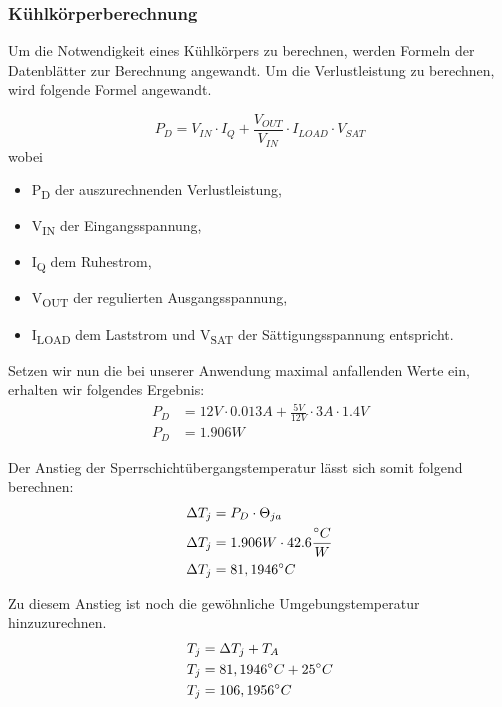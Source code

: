 \subsubsection{Kühlkörperberechnung}

Um die Notwendigkeit eines Kühlkörpers zu berechnen, werden Formeln der Datenblätter zur Berechnung angewandt.
Um die Verlustleistung zu berechnen, wird folgende Formel angewandt.

\begin{equation}
    P_D = V_{IN} \cdot I_Q + \frac{V_{OUT}}{V_{IN}} \cdot I_{LOAD} \cdot V_{SAT}
\end{equation}
wobei
\begin{itemize}
    \item P\textsubscript{D} der auszurechnenden Verlustleistung,
    \item V\textsubscript{IN} der Eingangsspannung,
    \item I\textsubscript{Q} dem Ruhestrom,
    \item V\textsubscript{OUT} der regulierten Ausgangsspannung,
    \item I\textsubscript{LOAD} dem Laststrom und V\textsubscript{SAT} der Sättigungsspannung entspricht.
\end{itemize}

Setzen wir nun die bei unserer Anwendung maximal anfallenden Werte ein, erhalten wir folgendes Ergebnis:
\begin{align*}
    P_D &= 12V \cdot 0.013A + \frac{5V}{12V} \cdot 3A \cdot 1.4V \\
    P_D &= 1.906W
\end{align*}

Der Anstieg der Sperrschichtübergangstemperatur lässt sich somit folgend berechnen:
\begin{align}
    \Delta T_j &= P_D \cdot \Theta_{ja} \\
    \Delta T_j &= 1.906W \cdot 42.6\frac{{}^{\circ}C}{W} \notag \\
    \Delta T_j &= 81,1946^{\circ}C \notag
\end{align}

Zu diesem Anstieg ist noch die gewöhnliche Umgebungstemperatur hinzuzurechnen.
\begin{align}
    T_j &= \Delta  T_j + T_A \\
    T_j &= 81,1946^{\circ}C + 25^{\circ}C \notag \\
    T_j &= 106,1956^{\circ}C \notag
\end{align}

